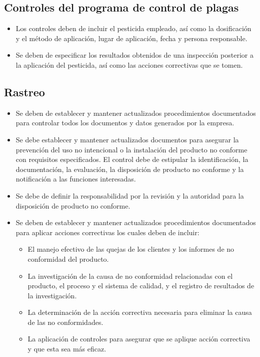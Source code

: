 \subsection{Controles del programa de control de plagas}

\begin{itemize}
	\item Los controles deben de incluir el pesticida empleado, así como la dosificación y el método de aplicación, lugar de aplicación, fecha y persona responsable.
	\item Se deben de especificar los resultados obtenidos de una inspección posterior a la aplicación del pesticida, así como las acciones correctivas que se tomen.
\end{itemize}

\subsection{Rastreo}

\begin{itemize}
	\item Se deben de establecer y mantener actualizados procedimientos documentados para controlar todos los documentos y datos generados por la empresa.
	\item Se debe establecer y mantener actualizados documentos para asegurar la prevención del uso no intencional o la instalación del producto no conforme con requisitos especificados. El control debe de estipular la identificación, la documentación, la evaluación, la disposición de producto no conforme y la notificación a las funciones interesadas.
	\item Se debe de definir la responsabilidad por la revisión y la autoridad para la disposición de producto no conforme.
	\item Se deben de establecer y mantener actualizados procedimientos documentados para aplicar acciones correctivas los cuales deben de incluir:
	      \begin{itemize}
		      \item El manejo efectivo de las quejas de los clientes y los informes de no conformidad del producto.
		      \item La investigación de la causa de no conformidad relacionadas con el producto, el proceso y el sistema de calidad, y el registro de resultados de la investigación.
		      \item La determinación de la acción correctiva necesaria para eliminar la causa de las no conformidades.
		      \item La aplicación de controles para asegurar que se aplique acción correctiva y que esta sea más eficaz.
	      \end{itemize}
\end{itemize}

